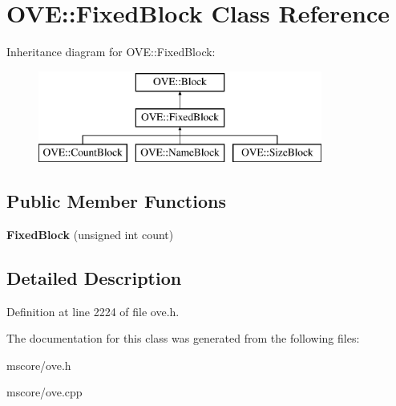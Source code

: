 \hypertarget{class_o_v_e_1_1_fixed_block}{}\section{O\+VE\+:\+:Fixed\+Block Class Reference}
\label{class_o_v_e_1_1_fixed_block}
Inheritance diagram for O\+VE\+:\+:Fixed\+Block\+:\begin{figure}[H]
\begin{center}
\leavevmode
\includegraphics[height=3.000000cm]{class_o_v_e_1_1_fixed_block}
\end{center}
\end{figure}
\subsection*{Public Member Functions}
\begin{DoxyCompactItemize}
\item 
\mbox{\label{class_o_v_e_1_1_fixed_block_adb01c571c655ef61c7db4431d90c6764}} 
{\bfseries Fixed\+Block} (unsigned int count)
\end{DoxyCompactItemize}


\subsection{Detailed Description}


Definition at line 2224 of file ove.\+h.



The documentation for this class was generated from the following files\+:\begin{DoxyCompactItemize}
\item 
mscore/ove.\+h\item 
mscore/ove.\+cpp\end{DoxyCompactItemize}
